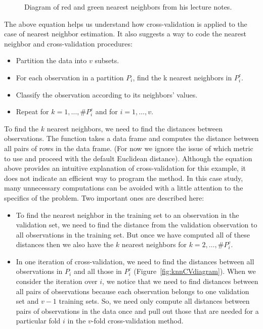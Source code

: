 \begin{figure}

\vspace{2in}

\caption{Diagram of red and green nearest neighbors 
from his lecture notes.}
\label{fig:knnDiagram}
\end{figure}

The above equation helps us understand how cross-validation is
applied to the case of nearest neighbor estimation. It also suggests 
a way to code the nearest neighbor and cross-validation procedures:

\begin{itemize}
\item Partition the data into $v$ subsets.
\item For each observation in a partition $P_i$, 
find the k nearest neighbors in $P_i^c$.
\item Classify the observation according to its neighbors' values. 
\item Repeat for $k = 1, \ldots ,\#P_i^c$
and for $i = 1, \ldots ,v$. 
\end{itemize}

To find the $k$ nearest neighbors, we need to find the distances
between observations. The  function takes a data
frame and computes the distance between all pairs of rows in the data
frame. (For now we ignore the issue of which metric to use and proceed
with the default Euclidean distance).  Although the equation above
provides an intuitive explanation of cross-validation for this
example, it does not indicate an efficient way to program the method.
In this case study, many unnecessary computations can be avoided with
a little attention to the specifics of the problem.  Two important
ones are described here:

\begin{itemize}
\item To find the nearest neighbor in the training set to an
  observation in the validation set, we need to find the distance from
  the validation observation to all observations in the training set.
  But once we have computed all of these distances then we also have
  the $k$ nearest neighbors for $k = 2, \ldots , \#P_i^c$.

\item In one iteration of cross-validation, we need to find the
  distances between all observations in $P_i$ and all those in $P_i^c$
  (Figure~\ref{fig:knnCVdiagram}).  When we consider the iteration
  over $i$, we notice that we need to find distances between all pairs
  of observations because each observation belongs to one validation
  set and $v-1$ training sets.  So, we need only compute all distances
  between pairs of observations in the data once and pull out those
  that are needed for a particular fold $i$ in the $v$-fold
  cross-validation method.
\end{itemize}

